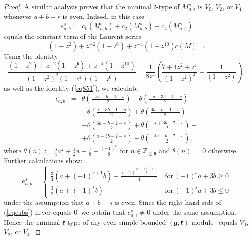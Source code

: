 \documentclass[12pt]{amsart}
\theoremstyle{plain} %
\newcommand {\ZZ} {\mathbb {Z}}
\newcommand{\kk}{\mathfrak{k}}
\renewcommand{\gg}{\mathfrak{g}}
\newcommand{\doublebrace}[4]{\left\{\begin{array}{ll}#1 & #2 \\ #3 & #4\end{array}\right.}
\newcommand {\eqdef} {:=}
\newcommand{\refeq}[1]{(\ref{#1})}
\newcommand {\gkm} {$(\gg,\kk)$-module}
\begin{document}
\begin{proof}
A similar analysis proves that the minimal $\kk$-type of $M_{a,b}^s$ is $V_0$, $V_2$, or $V_4$ whenever $a+b+s$ is even. Indeed, in this case
\[
e_{a,b}^s\eqdef c_0(M_{a,b}^s)+c_2(M_{a,b}^s)+c_4(M_{a,b}^s)
\]
equals the constant term of the Laurent series
\[
(1-z^2)+z^{-2}(1-z^6)+z^{-4}(1-z^{10})c(M)\quad .
\]
Using the identity
\[
\frac{(1-z^2)+z^{-2}(1-z^6)+z^{-4}(1-z^{10})}{(1-z^2)^2(1-z^4)(1-z^6)}=\frac{1}{8z^4}\left( \frac{7+4z^2+z^4}{(1-z^2)^3}+\frac{1}{(1+z^2)}\right),
\]
as well as the identity \refeq{eq851}, we calculate
\begin{eqnarray*}
e_{a,b}^s&=& \theta\left( \frac{-3a-b-1-s}{2} \right)-\theta\left( \frac{-a-3b-1-s}{2} \right)-\\
&&-\theta\left( \frac{a+3b-1-s}{2} \right)+\theta\left( \frac{3a+b-1-s}{2} \right)-\\
&&-\theta\left( \frac{3a-b-2-s}{2} \right)+\theta\left( \frac{-a+3b-2-s}{2} \right)+\\
&&+\theta\left( \frac{a-3b-2-s}{2} \right)-\theta\left( \frac{-3a+b-2-s}{2} \right),
\end{eqnarray*}
where $\displaystyle\theta(n)\eqdef \frac{3}{4}n^2+\frac{3}{2}n+\frac{7}{8}+\frac{(-1)^n}{8}$ for $n\in\ZZ_{\geq 0}$ and $\theta(n):=0$ otherwise. Further calculations show:
\begin{equation}\label{eqeabs}
e_{a,b}^s=\doublebrace{\displaystyle \frac{3}{4}\left(a+(-1)^{s+1}b\right)+\frac{(-1)^ {\frac{a+(-1)^{s+1}b-1}{2}}}{4}} {\mathrm{~for~}(-1)^sa+3b\geq 0}{\displaystyle\frac{3}{2}\left(a+(-1)^sb\right)}{\mathrm{~for~}(-1)^sa+3b\leq 0}
\end{equation}
under the assumption that $a+b+s$ is even. Since the right-hand side of \refeq{eqeabs} never equals 0, we obtain that $e_{a,b}^s\neq 0$ under the same assumption. Hence the minimal $\kk$-type of any even simple bounded \gkm~ equals $V_0$, $V_2$, or $V_4$.


\end{proof}
\end{document}
